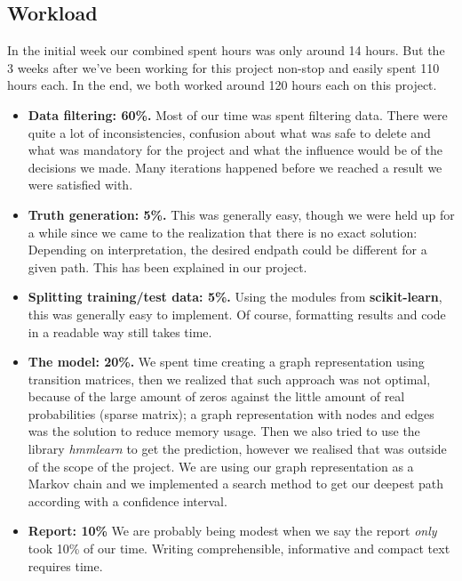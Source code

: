 \begin{appendices}

\section{Workload}\label{app:work}

In the initial week our combined spent hours was only around 14 hours. But the 3 weeks after we've been working for this project non-stop and easily spent 110 hours each. In the end, we both worked around 120 hours each on this project.
\begin{itemize}
	\item \textbf{Data filtering: 60\%.} Most of our time was spent filtering data. There were quite a lot of inconsistencies, confusion about what was safe to delete and what was mandatory for the project and what the influence would be of the decisions we made. Many iterations happened before we reached a result we were satisfied with.
	\item \textbf{Truth generation: 5\%.} This was generally easy, though we were held up for a while since we came to the realization that there is no exact solution: Depending on interpretation, the desired endpath could be different for a given path. This has been explained in our project.
	\item \textbf{Splitting training/test data: 5\%.} Using the modules from \textbf{scikit-learn}, this was generally easy to implement. Of course, formatting results and code in a readable way still takes time.
	\item \textbf{The model: 20\%.} We spent time creating a graph representation using transition matrices, then we realized that such approach was not optimal, because of the large amount of zeros against the little amount of real probabilities (sparse matrix); a graph representation with nodes and edges was the solution to reduce memory usage. Then we also tried to use the library \textit{hmmlearn} to get the prediction, however we realised that was outside of the scope of the project. We are using our graph representation as a Markov chain and we implemented a search method to get our deepest path according with a confidence interval.
	\item \textbf{Report: 10\%} We are probably being modest when we say the report \textit{only} took 10\% of our time. Writing comprehensible, informative and compact text requires time.
\end{itemize} 

\end{appendices}